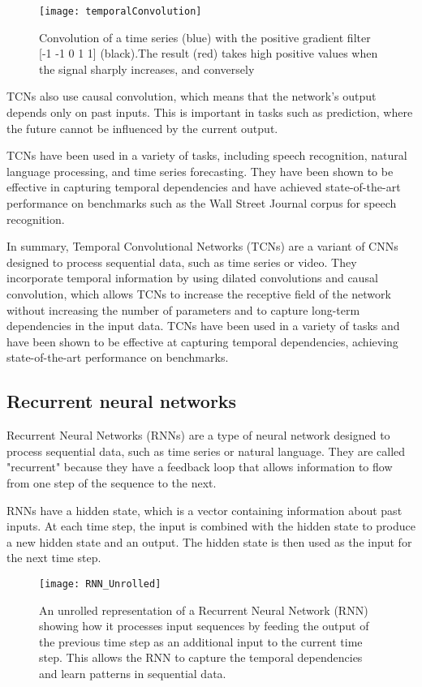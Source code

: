 \begin{figure}[H]
  \centering
  \texttt{[image: temporalConvolution]}
  \caption{Convolution of a time series (blue) with the positive gradient filter [-1 -1 0 1 1] (black).The result (red) takes high positive values when the signal sharply increases, and conversely\cite{tempCNN}}
\end{figure}

TCNs also use causal convolution, which means that the network's output depends only on past inputs.
This is important in tasks such as prediction, where the future cannot be influenced by the current output.

TCNs have been used in a variety of tasks, including speech recognition, natural language processing, and time series forecasting.
They have been shown to be effective in capturing temporal dependencies and have achieved state-of-the-art performance on benchmarks such as the Wall Street Journal corpus for speech recognition.

In summary, Temporal Convolutional Networks (TCNs) are a variant of CNNs designed to process sequential data, such as time series or video.
They incorporate temporal information by using dilated convolutions and causal convolution, which allows TCNs to increase the receptive field of the network without increasing the number of parameters and to capture long-term dependencies in the input data.
TCNs have been used in a variety of tasks and have been shown to be effective at capturing temporal dependencies, achieving state-of-the-art performance on benchmarks.

\subsection{Recurrent neural networks}

Recurrent Neural Networks (RNNs) \cite{graves2013generating, goodfellow2016deep} are a type of neural network designed to process sequential data, such as time series or natural language.
They are called "recurrent" because they have a feedback loop that allows information to flow from one step of the sequence to the next.

RNNs have a hidden state, which is a vector containing information about past inputs.
At each time step, the input is combined with the hidden state to produce a new hidden state and an output.
The hidden state is then used as the input for the next time step.

\begin{figure}[H]
  \centering
  \texttt{[image: RNN\_Unrolled]}
  \caption{An unrolled representation of a Recurrent Neural Network (RNN) showing how it processes input sequences by feeding the output of the previous time step as an additional input to the current time step. This allows the RNN to capture the temporal dependencies and learn patterns in sequential data.\cite{RNN:Unrolled}}
\end{figure}

